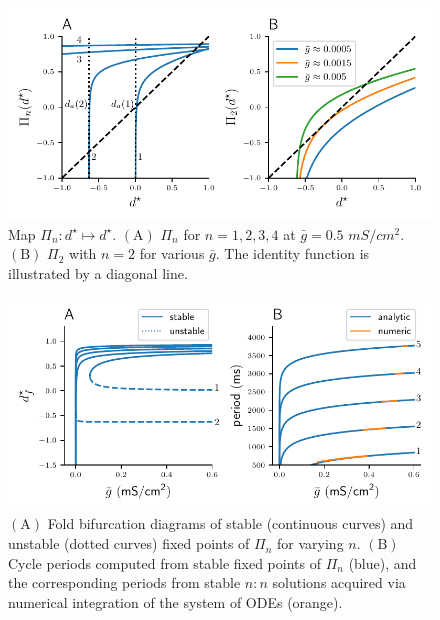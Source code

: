 \documentclass[utf8]{frontiersFPHY} %
\begin{document}
\begin{figure}[h!]
	\centering
	\includegraphics{Pn-map}
	\caption{Map $\Pi_{n}:d^{\star}\mapsto d^{\star}$. $\bm{\mathrm{(A)}}$ $\Pi_{n}$ for $n=1,2,3,4$
	at $\bar g=0.5$ $\si{mS/cm^{2}}$. $\bm{\mathrm{(B)}}$ $\Pi_{2}$ with $n=2$ for
	various $\bar g$. The identity function is illustrated by a diagonal line.~\label{fig:Pn-map}}
\end{figure}

\begin{figure}[h!]
	\centering
	\includegraphics{folds}
	\caption{$\bm{\mathrm{(A)}}$ Fold bifurcation diagrams of stable (continuous curves)
		and unstable (dotted curves) fixed points of $\Pi_{n}$ for varying $n$.
		$\bm{\mathrm{(B)}}$ Cycle periods computed from stable fixed points of $\Pi_{n}$ (blue), and the corresponding periods from stable $n:n$ solutions acquired via numerical integration of the system of ODEs
		(orange).~\label{fig:folds}}
\end{figure}
\end{document}
